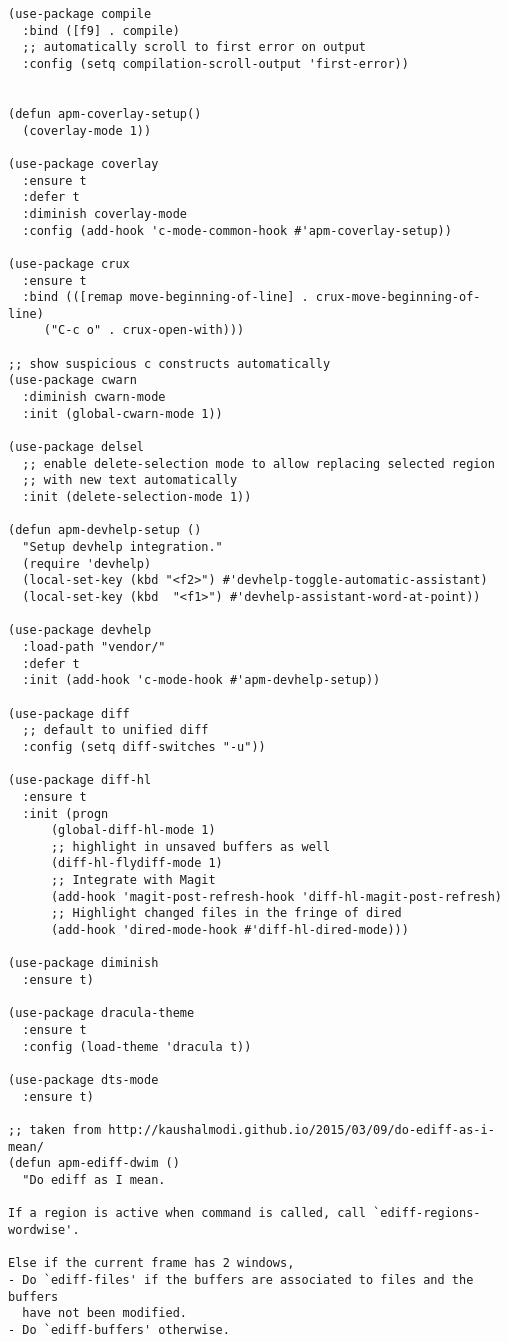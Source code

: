 \documentclass[11pt]{article}
\begin{document}
\begin{verbatim}
(use-package compile
  :bind ([f9] . compile)
  ;; automatically scroll to first error on output
  :config (setq compilation-scroll-output 'first-error))


(defun apm-coverlay-setup()
  (coverlay-mode 1))

(use-package coverlay
  :ensure t
  :defer t
  :diminish coverlay-mode
  :config (add-hook 'c-mode-common-hook #'apm-coverlay-setup))

(use-package crux
  :ensure t
  :bind (([remap move-beginning-of-line] . crux-move-beginning-of-line)
	 ("C-c o" . crux-open-with)))

;; show suspicious c constructs automatically
(use-package cwarn
  :diminish cwarn-mode
  :init (global-cwarn-mode 1))

(use-package delsel
  ;; enable delete-selection mode to allow replacing selected region
  ;; with new text automatically
  :init (delete-selection-mode 1))

(defun apm-devhelp-setup ()
  "Setup devhelp integration."
  (require 'devhelp)
  (local-set-key (kbd "<f2>") #'devhelp-toggle-automatic-assistant)
  (local-set-key (kbd  "<f1>") #'devhelp-assistant-word-at-point))

(use-package devhelp
  :load-path "vendor/"
  :defer t
  :init (add-hook 'c-mode-hook #'apm-devhelp-setup))

(use-package diff
  ;; default to unified diff
  :config (setq diff-switches "-u"))

(use-package diff-hl
  :ensure t
  :init (progn
	  (global-diff-hl-mode 1)
	  ;; highlight in unsaved buffers as well
	  (diff-hl-flydiff-mode 1)
	  ;; Integrate with Magit
	  (add-hook 'magit-post-refresh-hook 'diff-hl-magit-post-refresh)
	  ;; Highlight changed files in the fringe of dired
	  (add-hook 'dired-mode-hook #'diff-hl-dired-mode)))

(use-package diminish
  :ensure t)

(use-package dracula-theme
  :ensure t
  :config (load-theme 'dracula t))

(use-package dts-mode
  :ensure t)

;; taken from http://kaushalmodi.github.io/2015/03/09/do-ediff-as-i-mean/
(defun apm-ediff-dwim ()
  "Do ediff as I mean.

If a region is active when command is called, call `ediff-regions-wordwise'.

Else if the current frame has 2 windows,
- Do `ediff-files' if the buffers are associated to files and the buffers
  have not been modified.
- Do `ediff-buffers' otherwise.


\end{verbatim}
\end{document}
